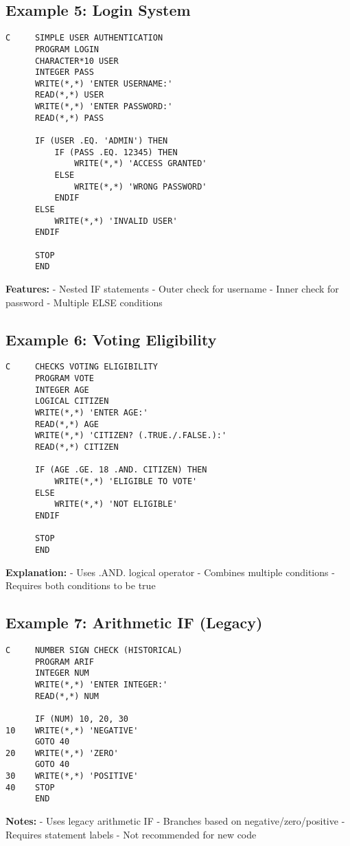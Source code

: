 \documentclass{book}
\begin{document}
\subsection*{Example 5: Login System}
\begin{verbatim}
C     SIMPLE USER AUTHENTICATION
      PROGRAM LOGIN
      CHARACTER*10 USER
      INTEGER PASS
      WRITE(*,*) 'ENTER USERNAME:'
      READ(*,*) USER
      WRITE(*,*) 'ENTER PASSWORD:'
      READ(*,*) PASS
      
      IF (USER .EQ. 'ADMIN') THEN
          IF (PASS .EQ. 12345) THEN
              WRITE(*,*) 'ACCESS GRANTED'
          ELSE
              WRITE(*,*) 'WRONG PASSWORD'
          ENDIF
      ELSE
          WRITE(*,*) 'INVALID USER'
      ENDIF
      
      STOP
      END
\end{verbatim}
\textbf{Features:}
- Nested IF statements
- Outer check for username
- Inner check for password
- Multiple ELSE conditions

\subsection*{Example 6: Voting Eligibility}
\begin{verbatim}
C     CHECKS VOTING ELIGIBILITY
      PROGRAM VOTE
      INTEGER AGE
      LOGICAL CITIZEN
      WRITE(*,*) 'ENTER AGE:'
      READ(*,*) AGE
      WRITE(*,*) 'CITIZEN? (.TRUE./.FALSE.):'
      READ(*,*) CITIZEN
      
      IF (AGE .GE. 18 .AND. CITIZEN) THEN
          WRITE(*,*) 'ELIGIBLE TO VOTE'
      ELSE
          WRITE(*,*) 'NOT ELIGIBLE'
      ENDIF
      
      STOP
      END
\end{verbatim}
\textbf{Explanation:}
- Uses .AND. logical operator
- Combines multiple conditions
- Requires both conditions to be true

\subsection*{Example 7: Arithmetic IF (Legacy)}
\begin{verbatim}
C     NUMBER SIGN CHECK (HISTORICAL)
      PROGRAM ARIF
      INTEGER NUM
      WRITE(*,*) 'ENTER INTEGER:'
      READ(*,*) NUM
      
      IF (NUM) 10, 20, 30
10    WRITE(*,*) 'NEGATIVE'
      GOTO 40
20    WRITE(*,*) 'ZERO'
      GOTO 40
30    WRITE(*,*) 'POSITIVE'
40    STOP
      END
\end{verbatim}
\textbf{Notes:}
- Uses legacy arithmetic IF
- Branches based on negative/zero/positive
- Requires statement labels
- Not recommended for new code
\end{document}
